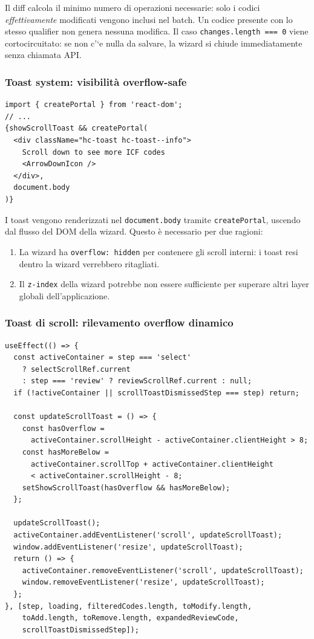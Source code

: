 \documentclass[a4paper,12pt]{article}
\begin{document}
\noindent Il diff calcola il minimo numero di operazioni necessarie:
solo i codici \textit{effettivamente} modificati vengono inclusi nel
batch. Un codice presente con lo stesso qualifier non genera nessuna
modifica. Il caso \texttt{changes.length === 0} viene cortocircuitato:
se non c'`{e} nulla da salvare, la wizard si chiude immediatamente senza
chiamata API.

\subsubsection{Toast system: visibilit\`{a} overflow-safe}

\begin{lstlisting}
import { createPortal } from 'react-dom';
// ...
{showScrollToast && createPortal(
  <div className="hc-toast hc-toast--info">
    Scroll down to see more ICF codes
    <ArrowDownIcon />
  </div>,
  document.body
)}
\end{lstlisting}

\noindent I toast vengono renderizzati nel \texttt{document.body} tramite
\texttt{createPortal}, uscendo dal flusso del DOM della wizard.
Questo \`{e} necessario per due ragioni:
\begin{enumerate}[noitemsep]
  \item La wizard ha \texttt{overflow: hidden} per contenere gli scroll
        interni: i toast resi dentro la wizard verrebbero ritagliati.
  \item Il \texttt{z-index} della wizard potrebbe non essere sufficiente
        per superare altri layer globali dell'applicazione.
\end{enumerate}

\subsubsection{Toast di scroll: rilevamento overflow dinamico}
\vspace{2pt}
\begin{lstlisting}
useEffect(() => {
  const activeContainer = step === 'select'
    ? selectScrollRef.current
    : step === 'review' ? reviewScrollRef.current : null;
  if (!activeContainer || scrollToastDismissedStep === step) return;

  const updateScrollToast = () => {
    const hasOverflow =
      activeContainer.scrollHeight - activeContainer.clientHeight > 8;
    const hasMoreBelow =
      activeContainer.scrollTop + activeContainer.clientHeight
      < activeContainer.scrollHeight - 8;
    setShowScrollToast(hasOverflow && hasMoreBelow);
  };

  updateScrollToast();
  activeContainer.addEventListener('scroll', updateScrollToast);
  window.addEventListener('resize', updateScrollToast);
  return () => {
    activeContainer.removeEventListener('scroll', updateScrollToast);
    window.removeEventListener('resize', updateScrollToast);
  };
}, [step, loading, filteredCodes.length, toModify.length,
    toAdd.length, toRemove.length, expandedReviewCode,
    scrollToastDismissedStep]);
\end{lstlisting}
\end{document}
